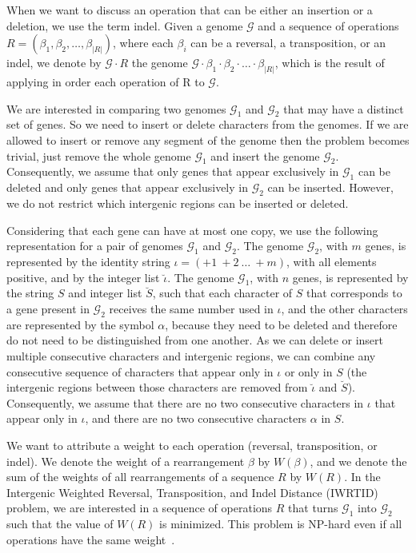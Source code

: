 \documentclass[12pt]{article}
\begin{document}
When we want to discuss an operation that can be either an insertion or a deletion, we use the term indel. Given a genome $\mathcal{G}$ and a sequence of operations $R = (\beta_1,\beta_2,\ldots,\beta_{|R|})$, where each $\beta_i$ can be a reversal, a transposition, or an indel, we denote by $\mathcal{G} \cdot R$ the genome $\mathcal{G} \cdot \beta_1 \cdot \beta_2 \cdot \ldots \cdot \beta_{|R|}$, which is the result of applying in order each operation of R to $\mathcal{G}$.

We are interested in comparing two genomes $\mathcal{G}_1$ and $\mathcal{G}_2$ that may have a distinct set of genes. So we need to insert or delete characters from the genomes. If we are allowed to insert or remove any segment of the genome then the problem becomes trivial, just remove the whole genome $\mathcal{G}_1$ and insert the genome $\mathcal{G}_2$. Consequently, we assume that only genes that appear exclusively in $\mathcal{G}_1$ can be deleted and only genes that appear exclusively in $\mathcal{G}_2$ can be inserted. However, we do not restrict which intergenic regions can be inserted or deleted.

Considering that each gene can have at most one copy, we use the following representation for a pair of genomes $\mathcal{G}_1$ and $\mathcal{G}_2$. The genome $\mathcal{G}_2$, with $m$ genes, is represented by the identity string $\iota = (+1~+2~\ldots~+m)$, with all elements positive, and by the integer list $\breve{\iota}$. The genome $\mathcal{G}_1$, with $n$ genes, is represented by the string $S$ and integer list $\breve{S}$, such that each character of $S$ that corresponds to a gene present in $\mathcal{G}_2$ receives the same number used in $\iota$, and the other characters are represented by the symbol $\alpha$, because they need to be deleted and therefore do not need to be distinguished from one another. As we can delete or insert multiple consecutive characters and intergenic regions, we can combine any consecutive sequence of characters that appear only in $\iota$ or only in $S$ (the intergenic regions between those characters are removed from $\breve{\iota}$ and $\breve{S}$). Consequently, we assume that there are no two consecutive characters in $\iota$ that appear only in $\iota$, and there are no two consecutive characters $\alpha$ in $S$.

We want to attribute a weight to each operation (reversal, transposition, or indel). We denote the weight of a rearrangement $\beta$ by $W(\beta)$, and we denote the sum of the weights of all rearrangements of a sequence $R$ by $W(R)$. In the Intergenic Weighted Reversal, Transposition, and Indel Distance (IWRTID) problem, we are interested in a sequence of operations $R$ that turns $\mathcal{G}_1$ into $\mathcal{G}_2$ such that the value of $W(R)$ is minimized. This problem is NP-hard even if all operations have the same weight~\cite{2023b-alexandrino-etal}.
\end{document}

